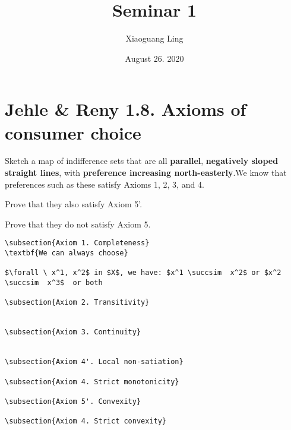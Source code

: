\documentclass{article}
\title{Seminar 1}
\author{Xiaoguang Ling }
\date{August 26. 2020}
\begin{document}
\maketitle


\section{Jehle \& Reny 1.8. Axioms of consumer choice}

Sketch a map of indifference sets that are all \textbf{parallel}, \textbf{negatively sloped 
straight lines}, with \textbf{preference increasing north-easterly}.We know that preferences 
such as these satisfy Axioms 1, 2, 3, and 4. 

Prove that they also satisfy Axiom 5'. 

Prove that they do not satisfy Axiom 5.


\begin{verbatim}
\subsection{Axiom 1. Completeness}
\textbf{We can always choose}

$\forall \ x^1, x^2$ in $X$, we have: $x^1 \succsim  x^2$ or $x^2 \succsim  x^3$  or both

\subsection{Axiom 2. Transitivity}


\subsection{Axiom 3. Continuity}


\subsection{Axiom 4'. Local non-satiation}

\subsection{Axiom 4. Strict monotonicity}

\subsection{Axiom 5'. Convexity}

\subsection{Axiom 4. Strict convexity}

\end{verbatim}
\end{document}
